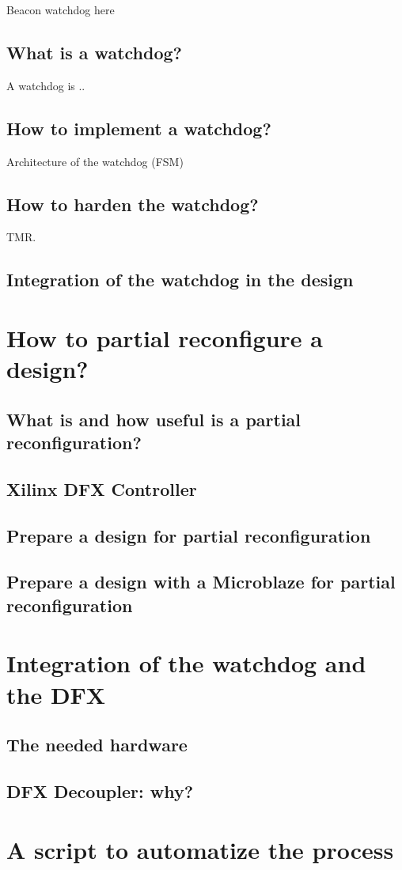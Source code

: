 Beacon watchdog here

\subsection{What is a watchdog?}

A watchdog is ..

\subsection{How to implement a watchdog?}

Architecture of the watchdog (FSM)

\subsection{How to harden the watchdog?}

TMR.

\subsection{Integration of the watchdog in the design}

\section{How to partial reconfigure a design?}
\subsection{What is and how useful is a partial reconfiguration?}
\subsection{Xilinx DFX Controller}
\subsection{Prepare a design for partial reconfiguration}
\subsection{Prepare a design with a Microblaze for partial reconfiguration}

\section{Integration of the watchdog and the DFX}
\subsection{The needed hardware}
\subsection{DFX Decoupler: why?}

\section{A script to automatize the process}